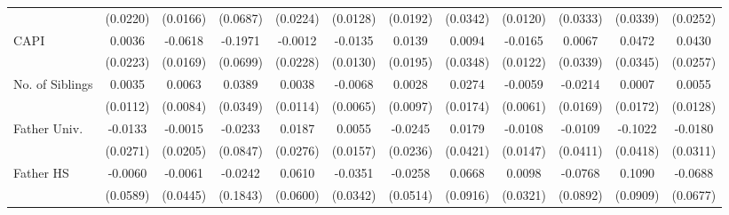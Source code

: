 \begin{table}[htbp]
\begin{tabular}{l*{11}{c}}
            &    (0.0220)         &    (0.0166)         &    (0.0687)         &    (0.0224)         &    (0.0128)         &    (0.0192)         &    (0.0342)         &    (0.0120)         &    (0.0333)         &    (0.0339)         &    (0.0252)         \\
\addlinespace
CAPI        &      0.0036         &     -0.0618\sym{***}&     -0.1971\sym{**} &     -0.0012         &     -0.0135         &      0.0139         &      0.0094         &     -0.0165         &      0.0067         &      0.0472         &      0.0430         \\
            &    (0.0223)         &    (0.0169)         &    (0.0699)         &    (0.0228)         &    (0.0130)         &    (0.0195)         &    (0.0348)         &    (0.0122)         &    (0.0339)         &    (0.0345)         &    (0.0257)         \\
\addlinespace
No. of Siblings&      0.0035         &      0.0063         &      0.0389         &      0.0038         &     -0.0068         &      0.0028         &      0.0274         &     -0.0059         &     -0.0214         &      0.0007         &      0.0055         \\
            &    (0.0112)         &    (0.0084)         &    (0.0349)         &    (0.0114)         &    (0.0065)         &    (0.0097)         &    (0.0174)         &    (0.0061)         &    (0.0169)         &    (0.0172)         &    (0.0128)         \\
\addlinespace
Father Univ.&     -0.0133         &     -0.0015         &     -0.0233         &      0.0187         &      0.0055         &     -0.0245         &      0.0179         &     -0.0108         &     -0.0109         &     -0.1022\sym{*}  &     -0.0180         \\
            &    (0.0271)         &    (0.0205)         &    (0.0847)         &    (0.0276)         &    (0.0157)         &    (0.0236)         &    (0.0421)         &    (0.0147)         &    (0.0411)         &    (0.0418)         &    (0.0311)         \\
\addlinespace
Father HS   &     -0.0060         &     -0.0061         &     -0.0242         &      0.0610         &     -0.0351         &     -0.0258         &      0.0668         &      0.0098         &     -0.0768         &      0.1090         &     -0.0688         \\
            &    (0.0589)         &    (0.0445)         &    (0.1843)         &    (0.0600)         &    (0.0342)         &    (0.0514)         &    (0.0916)         &    (0.0321)         &    (0.0892)         &    (0.0909)         &    (0.0677)         \\

\end{tabular}
\end{table}
